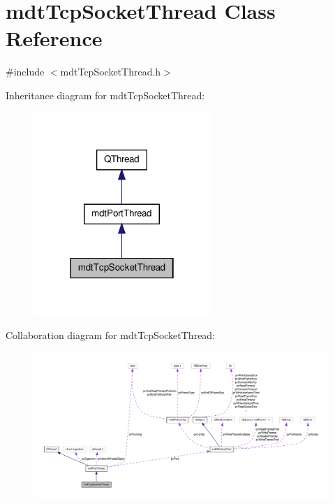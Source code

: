 \hypertarget{classmdt_tcp_socket_thread}{\section{mdt\-Tcp\-Socket\-Thread Class Reference}
\label{classmdt_tcp_socket_thread}
}


{\ttfamily \#include $<$mdt\-Tcp\-Socket\-Thread.\-h$>$}



Inheritance diagram for mdt\-Tcp\-Socket\-Thread\-:
\nopagebreak
\begin{figure}[H]
\begin{center}
\leavevmode
\includegraphics[width=190pt]{classmdt_tcp_socket_thread__inherit__graph}
\end{center}
\end{figure}


Collaboration diagram for mdt\-Tcp\-Socket\-Thread\-:
\nopagebreak
\begin{figure}[H]
\begin{center}
\leavevmode
\includegraphics[width=350pt]{classmdt_tcp_socket_thread__coll__graph}
\end{center}
\end{figure}

